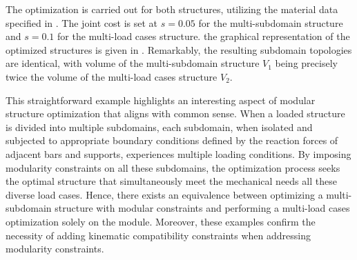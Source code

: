 The optimization is carried out for both structures, utilizing the material data specified in . The joint cost is set at $s = 0.05$ for the multi-subdomain structure and $s = 0.1$ for the multi-load cases structure. the graphical representation of the optimized structures is given in . Remarkably, the resulting subdomain topologies are identical, with volume  of the multi-subdomain structure $V_1$ being precisely twice the volume of the multi-load cases structure $V_2$. 

This straightforward example highlights an interesting aspect of modular structure optimization that aligns with common sense. When a loaded structure is divided into multiple subdomains, each subdomain, when isolated and subjected to appropriate boundary conditions defined by the reaction forces of adjacent bars and supports, experiences multiple loading conditions. By imposing modularity constraints on all these subdomains, the optimization process seeks the optimal structure that simultaneously meet the mechanical needs all these diverse load cases. Hence, there exists an equivalence between optimizing a multi-subdomain structure with modular constraints and performing a multi-load cases optimization solely on the module. Moreover, these examples confirm the necessity of adding kinematic compatibility constraints when addressing modularity constraints.
\begin{figure}[]
    \hspace*{\fill}
    \hfill
    \hspace*{\fill}
    \caption{}
    \label{fig:05_cell_multi_eq}
\end{figure}

